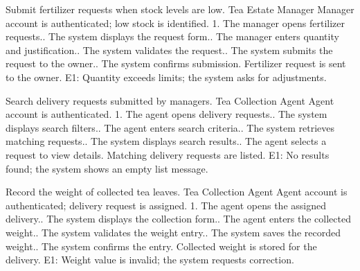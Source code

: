 {Submit fertilizer requests when stock levels are low.}
{Tea Estate Manager}
{Manager account is authenticated; low stock is identified.}
{1. The manager opens fertilizer requests.. The system displays the request form.. The manager enters quantity and justification.. The system validates the request.. The system submits the request to the owner.. The system confirms submission.}
{Fertilizer request is sent to the owner.}
{E1: Quantity exceeds limits; the system asks for adjustments.}

{Search delivery requests submitted by managers.}
{Tea Collection Agent}
{Agent account is authenticated.}
{1. The agent opens delivery requests.. The system displays search filters.. The agent enters search criteria.. The system retrieves matching requests.. The system displays search results.. The agent selects a request to view details.}
{Matching delivery requests are listed.}
{E1: No results found; the system shows an empty list message.}

{Record the weight of collected tea leaves.}
{Tea Collection Agent}
{Agent account is authenticated; delivery request is assigned.}
{1. The agent opens the assigned delivery.. The system displays the collection form.. The agent enters the collected weight.. The system validates the weight entry.. The system saves the recorded weight.. The system confirms the entry.}
{Collected weight is stored for the delivery.}
{E1: Weight value is invalid; the system requests correction.}

